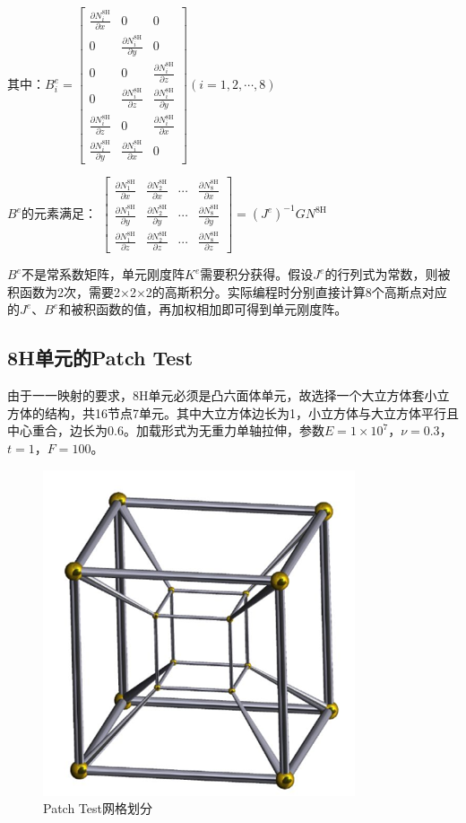 \documentclass{ctexart}
\begin{document}
其中：$B_{i}^{e}=\left[\begin{array}{ccc}
\frac{\partial N_{i}^{8\mathrm{H}}}{\partial x} & 0 & 0\\
0 & \frac{\partial N_{i}^{8\mathrm{H}}}{\partial y} & 0\\
0 & 0 & \frac{\partial N_{i}^{8\mathrm{H}}}{\partial z}\\
0 & \frac{\partial N_{i}^{8\mathrm{H}}}{\partial z} & \frac{\partial N_{i}^{8\mathrm{H}}}{\partial y}\\
\frac{\partial N_{i}^{8\mathrm{H}}}{\partial z} & 0 & \frac{\partial N_{i}^{8\mathrm{H}}}{\partial x}\\
\frac{\partial N_{i}^{8\mathrm{H}}}{\partial y} & \frac{\partial N_{i}^{8\mathrm{H}}}{\partial x} & 0
\end{array}\right](i=1,2,\cdots,8)$
 
$B^{e}$的元素满足：
$\left[\begin{array}{cccc}
\frac{\partial N_{1}^{8\mathrm{H}}}{\partial x} & \frac{\partial N_{2}^{8\mathrm{H}}}{\partial x} & \cdots & \frac{\partial N_{8}^{8\mathrm{H}}}{\partial x}\\
\frac{\partial N_{1}^{8\mathrm{H}}}{\partial y} & \frac{\partial N_{2}^{8\mathrm{H}}}{\partial y} & \cdots & \frac{\partial N_{8}^{8\mathrm{H}}}{\partial y}\\
\frac{\partial N_{1}^{8\mathrm{H}}}{\partial z} & \frac{\partial N_{2}^{8\mathrm{H}}}{\partial z} & \cdots & \frac{\partial N_{8}^{8\mathrm{H}}}{\partial z}
\end{array}\right]=(J^{e})^{-1}GN^{8\mathrm{H}}$

 $B^{e}$不是常系数矩阵，单元刚度阵$K^{e}$需要积分获得。假设$J^{e}$的行列式为常数，则被积函数为2次，需要2×2×2的高斯积分。实际编程时分别直接计算8个高斯点对应的$J^{e}$、$B^{e}$和被积函数的值，再加权相加即可得到单元刚度阵。

\subsection{8H单元的Patch Test}
 由于一一映射的要求，8H单元必须是凸六面体单元，故选择一个大立方体套小立方体的结构，共16节点7单元。其中大立方体边长为1，小立方体与大立方体平行且中心重合，边长为0.6。加载形式为无重力单轴拉伸，参数$E=1×10^{7}$，$\nu=0.3$，$t=1$，$F=100$。            

\begin{figure}[H]
\centering  
\includegraphics[width = .4\textwidth]{h8_2.png} 
\caption{Patch Test网格划分} 
\label{f2.2} 
\end{figure}
\end{document}
